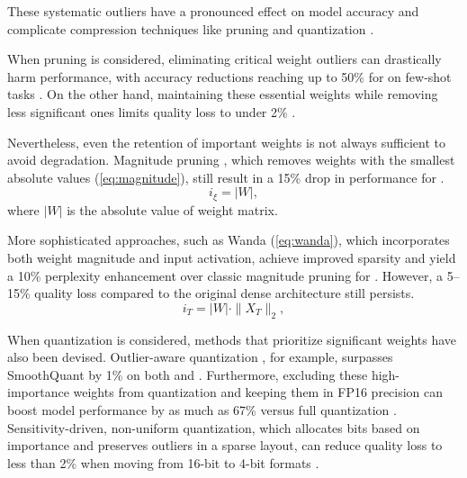         These systematic outliers have a pronounced effect on model accuracy and complicate compression techniques like pruning and quantization \cite{an2025systematicoutlierslargelanguage}. 
        
        When pruning is considered, eliminating critical weight outliers can drastically harm performance, with accuracy reductions reaching up to 50\% for \llamaTwoSmall{} on few-shot tasks \cite{yu2024superweightlargelanguage}. On the other hand, maintaining these essential weights while removing less significant ones limits quality loss to under 2\% \cite{yu2024superweightlargelanguage}.

        Nevertheless, even the retention of important weights is not always sufficient to avoid degradation. Magnitude pruning \cite{han2016deepcompressioncompressingdeep}, which removes weights with the smallest absolute values (\ref{eq:magnitude}), still result in a 15\% drop in performance for \llamaTwoSmall{} \cite{wanda}.
        \begin{equation}\label{eq:magnitude}
            i_\xi = |W|,
        \end{equation}
        where $|W|$ is the absolute value of weight matrix.

        More sophisticated approaches, such as Wanda \cite{wanda} (\ref{eq:wanda}), which incorporates both weight magnitude and input activation, achieve improved sparsity and yield a 10\% perplexity enhancement over classic magnitude pruning for \llamaTwoSmall{}. However, a 5–15\% quality loss compared to the original dense architecture still persists.
        \begin{equation}\label{eq:wanda}
            i_T = |W| \cdot \|X_T\|_2,
        \end{equation}

        When quantization is considered, methods that prioritize significant weights have also been devised. Outlier-aware quantization \cite{yu2024superweightlargelanguage}, for example, surpasses SmoothQuant \cite{xiao2024smoothquantaccurateefficientposttraining} by 1\% on both \llamaTwoSmall{} and \llamaTwoBig{} \cite{yu2024superweightlargelanguage}. Furthermore, excluding these high-importance weights from quantization and keeping them in FP16 precision can boost model performance by as much as 67\% versus full quantization \cite{quantization_1}. Sensitivity-driven, non-uniform quantization, which allocates bits based on importance and preserves outliers in a sparse layout, can reduce quality loss to less than 2\% when moving from 16-bit to 4-bit formats \cite{kim2024squeezellmdenseandsparsequantization}.
